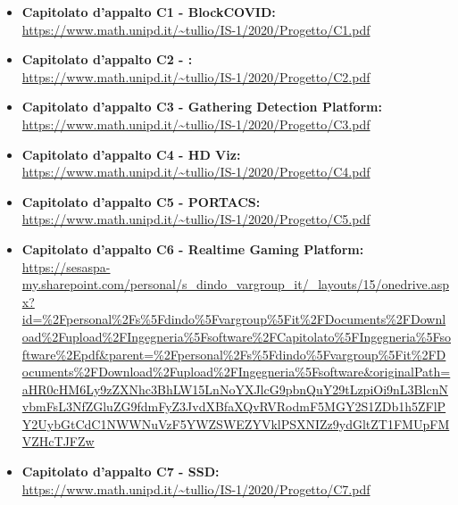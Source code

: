 \begin{itemize}
\item \textbf {Capitolato d'appalto C1 - BlockCOVID:}\\
\url{https://www.math.unipd.it/~tullio/IS-1/2020/Progetto/C1.pdf}
\item \textbf {Capitolato d'appalto C2 - \NomeProgetto:}\\
\url{https://www.math.unipd.it/~tullio/IS-1/2020/Progetto/C2.pdf}
\item \textbf {Capitolato d'appalto C3 - Gathering Detection Platform:}\\
\url{https://www.math.unipd.it/~tullio/IS-1/2020/Progetto/C3.pdf}
\item \textbf {Capitolato d'appalto C4 - HD Viz:}\\
\url{https://www.math.unipd.it/~tullio/IS-1/2020/Progetto/C4.pdf}
\item \textbf {Capitolato d'appalto C5 - PORTACS:}\\
\url{https://www.math.unipd.it/~tullio/IS-1/2020/Progetto/C5.pdf}
\item \textbf {Capitolato d'appalto C6 - Realtime Gaming Platform:}\\
\url{https://sesaspa-my.sharepoint.com/personal/s_dindo_vargroup_it/_layouts/15/onedrive.aspx?id=%2Fpersonal%2Fs%5Fdindo%5Fvargroup%5Fit%2FDocuments%2FDownload%2Fupload%2FIngegneria%5Fsoftware%2FCapitolato%5FIngegneria%5Fsoftware%2Epdf&parent=%2Fpersonal%2Fs%5Fdindo%5Fvargroup%5Fit%2FDocuments%2FDownload%2Fupload%2FIngegneria%5Fsoftware&originalPath=aHR0cHM6Ly9zZXNhc3BhLW15LnNoYXJlcG9pbnQuY29tLzpiOi9nL3BlcnNvbmFsL3NfZGluZG9fdmFyZ3JvdXBfaXQvRVRodmF5MGY2S1ZDb1h5ZFlPY2UybGtCdC1NWWNuVzF5YWZSWEZYVklPSXNIZz9ydGltZT1FMUpFMVZHcTJFZw}
\item \textbf {Capitolato d'appalto C7 - SSD:}\\
\url{https://www.math.unipd.it/~tullio/IS-1/2020/Progetto/C7.pdf}

\end{itemize}
